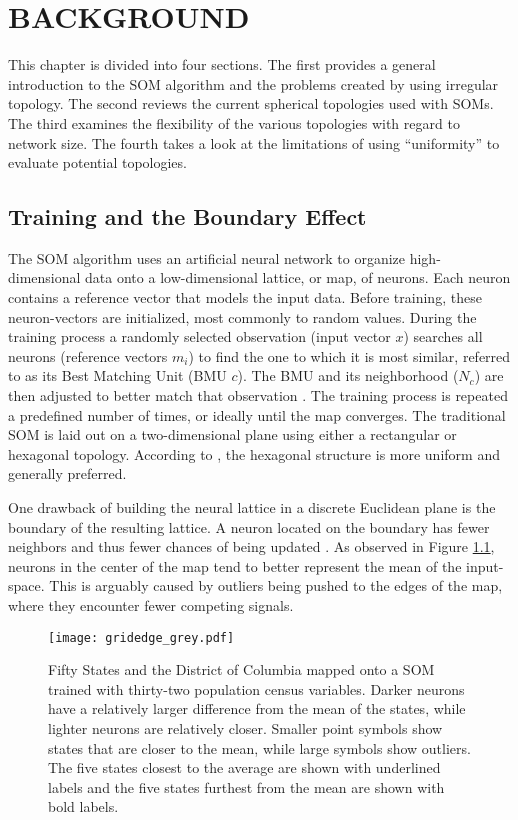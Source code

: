 \chapter{BACKGROUND}
This chapter is divided into four sections.  The first provides a general
introduction to the SOM algorithm and the problems created by using irregular
topology. The second reviews the current spherical topologies used with SOMs.
The third examines the flexibility of the various topologies with regard to
network size. The fourth takes a look at the limitations of using ``uniformity''
to evaluate potential topologies.

\section{Training and the Boundary Effect}
The SOM algorithm uses an artificial neural network to organize
high-dimensional data onto a low-dimensional lattice, or map, of neurons.
Each neuron contains a reference vector that models the input data.  Before
training, these neuron-vectors are initialized, most commonly to random
values.  During the training process a randomly selected observation (input
vector $x$) searches all neurons (reference vectors $m_i$) to find the one to
which it is most similar, referred to as its Best Matching Unit (BMU $c$).
The BMU and its neighborhood ($N_c$) are then adjusted to better match that
observation \citep{Kohonen2000}.  The training process is repeated a
predefined number of times, or ideally until the map converges. The
traditional SOM is laid out on a two-dimensional plane using either a
rectangular or hexagonal topology.  According to \cite{wu2006}, the hexagonal
structure is more uniform and generally preferred.

One drawback of building the neural lattice in a discrete Euclidean plane is the
boundary of the resulting lattice.  A neuron located on the boundary has fewer
neighbors and thus fewer chances of being updated \citep{wu2006}.  As observed
in Figure \ref{figure1}, neurons in the center of the map tend to better
represent the mean of the input-space.  This is arguably caused by outliers
being pushed to the edges of the map, where they encounter fewer competing
signals.




\begin{figure}
\centering
\texttt{[image: gridedge\_grey.pdf]}
\caption{Fifty States and the District of Columbia mapped onto a
SOM trained with thirty-two population census variables.  Darker neurons have a
relatively larger difference from the mean of the states, while lighter
neurons are relatively closer.  Smaller point symbols show states that are closer to the
mean, while large symbols show outliers. The five states closest to the average are shown
with underlined labels and the five states furthest from the mean are shown with
bold labels.}
\label{figure1}
\end{figure}

